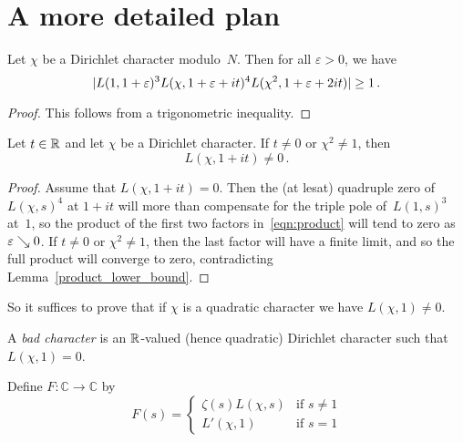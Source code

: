 \section{A more detailed plan}

\begin{lemma} \label{product_lower_bound}
  \leanok
  Let $\chi$ be a Dirichlet character modulo~$N$. Then for all $\varepsilon > 0$, we have
  \begin{equation} \label {eqn:product}
    |L(1, 1 + \varepsilon)^3 L(\chi, 1 + \varepsilon + it)^4 L(\chi^2, 1 + \varepsilon + 2it)| \ge 1 \,.
  \end{equation}
\end{lemma}

\begin{proof}
  \leanok
  This follows from a trigonometric inequality.
\end{proof}

\begin{lemma} \label{non_quadratic}
  Let $t \in \mathbb{R}$ and let $\chi$ be a Dirichlet character. If $t \ne 0$ or $\chi^2 \ne 1$, then
  \[ L(\chi, 1 + it) \ne 0 \,. \]
\end{lemma}

\begin{proof}
  Assume that $L(\chi, 1 + it) = 0$. Then the (at lesat) quadruple zero of~$L(\chi, s)^4$ at $1 + it$
  will more than compensate for the triple pole of~$L(1, s)^3$ at~$1$, so the product of the first
  two factors in~\eqref{eqn:product} will tend to zero as $\varepsilon \searrow 0$.
  If $t \ne 0$ or $\chi^2 \ne 1$, then the last factor will have a finite limit, and so the
  full product will converge to zero, contradicting Lemma~\ref{product_lower_bound}.
\end{proof}


So it suffices to prove that if $\chi$ is a quadratic character we have $L(\chi, 1) \ne 0$.

\begin{definition} \label{def:bad_char}
  \leanok
  A \emph{bad character} is an $\mathbb{R}$-valued (hence quadratic) Dirichlet character such that $L(\chi, 1) = 0$.
\end{definition}

\begin{definition} \label{def:bad_char_F}
  \leanok
  Define $F \colon \mathbb{C} \to \mathbb{C}$ by
  \[ F(s) = \begin{cases}
    \zeta(s) L(\chi, s) & \text{if $s \ne 1$} \\
    L'(\chi, 1) & \text{if $s = 1$}
    \end{cases}
  \]
\end{definition}

